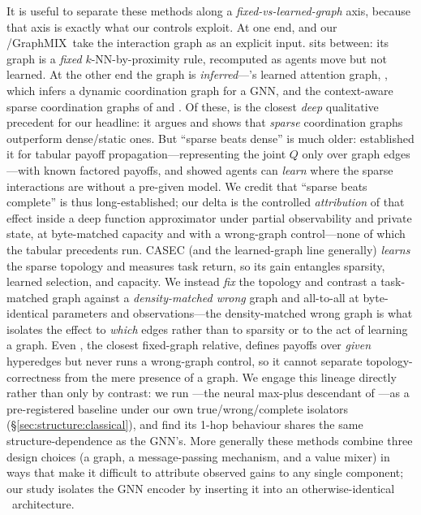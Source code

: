 It is useful to separate these methods along a \emph{fixed-vs-learned-graph}
axis, because that axis is exactly what our controls exploit. At one end,
 and our \gnnqmix/GraphMIX\ take the interaction graph as an
explicit input.  sits between: its graph is a \emph{fixed}
$k$-NN-by-proximity rule, recomputed as agents move but not learned. At the
other end the graph is \emph{inferred}---'s learned attention
graph,  \citep{li_2021_dicg}, which infers a dynamic
coordination graph for a GNN, and the context-aware sparse coordination graphs
of  \citep{wang_2022_casec} and  \citep{kang_2022_nonlinearcg}. Of these, 
is the closest \emph{deep} qualitative precedent for our headline: it argues and
shows that \emph{sparse} coordination graphs outperform dense/static ones. But
``sparse beats dense'' is much older: \citet{kok_2004_sparseq} established it for
tabular payoff propagation---representing the joint $Q$ only over graph
edges---with known factored payoffs, and \citet{melo_2009_sparseinteractions}
showed agents can \emph{learn} where the sparse interactions are without a
pre-given model. We credit that ``sparse beats complete'' is thus
long-established; our delta is the controlled \emph{attribution} of that effect
inside a deep function approximator under partial observability and private
state, at byte-matched capacity and with a wrong-graph control---none of which
the tabular precedents run. CASEC (and the learned-graph line generally) \emph{learns}
the sparse topology and measures task return, so its gain entangles sparsity,
learned selection, and capacity. We instead \emph{fix} the topology and contrast
a task-matched graph against a \emph{density-matched wrong} graph and all-to-all
at byte-identical parameters and observations---the density-matched wrong graph
is what isolates the effect to \emph{which} edges rather than to sparsity or to
the act of learning a graph. Even , the closest fixed-graph
relative, defines payoffs over \emph{given} hyperedges but never runs a
wrong-graph control, so it cannot separate topology-correctness from the mere
presence of a graph. We engage this lineage directly rather than only by
contrast: we run  \citep{boehmer_2020_dcg}---the neural max-plus
descendant of \citet{kok_2006_payoffprop}---as a pre-registered baseline under
our own true/wrong/complete isolators (\S\ref{sec:structure:classical}), and
find its 1-hop behaviour shares the same structure-dependence as the GNN's.
More generally these methods combine three design choices
(a graph, a message-passing mechanism, and a value mixer) in ways that make it
difficult to attribute observed gains to any single component; our study
isolates the GNN encoder by inserting it into an otherwise-identical \qmix\
architecture.


